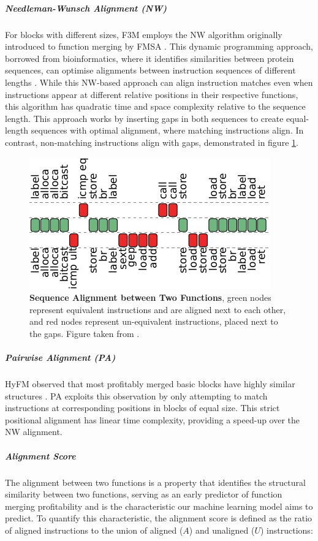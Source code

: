 \subparagraph{Needleman-Wunsch Alignment (NW)}
For blocks with different sizes, F3M employs the NW algorithm originally introduced to function merging by FMSA \cite{FunctionMergingSequenceAlignment}. This dynamic programming approach, borrowed from bioinformatics, where it identifies similarities between protein sequences, can optimise alignments between instruction sequences of different lengths \cite{NeedlemanWunschAlgorithm}. While this NW-based approach can align instruction matches even when instructions appear at different relative positions in their respective functions, this algorithm has quadratic time and space complexity relative to the sequence length. This approach works by inserting gaps in both sequences to create equal-length sequences with optimal alignment, where matching instructions align. In contrast, non-matching instructions align with gaps, demonstrated in figure \ref{fig:SequenceAlignment2Funcs}.

\begin{figure}[tbh!]
\centering
\includegraphics[scale=1]{Figures/FMSA_FunctionSA.pdf}
\caption{\textbf{Sequence Alignment between Two Functions}, green nodes represent equivalent instructions and are aligned next to each other, and red nodes represent un-equivalent instructions, placed next to the gaps. Figure taken from \cite{FunctionMergingSequenceAlignment}.}\label{fig:SequenceAlignment2Funcs}
\end{figure}

\subparagraph{Pairwise Alignment (PA)}
HyFM observed that most profitably merged basic blocks have highly similar structures \cite{HyFM:FunctionMergingForFree}. PA exploits this observation by only attempting to match instructions at corresponding positions in blocks of equal size. This strict positional alignment has linear time complexity, providing a speed-up over the NW alignment.

\subparagraph{Alignment Score} \label{METRIC:AlignmentScore}
The alignment between two functions is a property that identifies the structural similarity between two functions, serving as an early predictor of function merging profitability and is the characteristic our machine learning model aims to predict. To quantify this characteristic, the alignment score is defined as the ratio of aligned instructions to the union of aligned ($A$) and unaligned ($U$) instructions:

